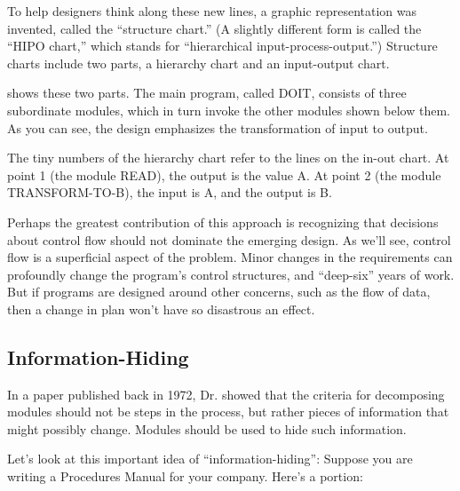 To help designers think along these new lines, a graphic
representation was invented, called the ``structure chart.''%
(A slightly different form is called the ``HIPO chart,'' which stands
for ``hierarchical input-process-output.'') Structure charts include
two parts, a hierarchy chart and an input-output chart.


 shows these two parts. The main program, called DOIT,
consists of three subordinate modules, which in turn invoke the other
modules shown below them. As you can see, the design emphasizes the
transformation of input to output. 

The tiny numbers of the hierarchy chart refer to the lines on the
in-out chart. At point 1 (the module READ), the output is the value A.
At point 2 (the module TRANSFORM-TO-B), the input is A, and the output
is B. 

Perhaps the greatest contribution of this approach is recognizing that
decisions about control flow should not dominate the emerging design.
As we'll see, control flow is a superficial aspect of the problem.
Minor changes in the requirements can profoundly change the program's
control structures, and ``deep-six'' years of work.  But if programs
are designed around other concerns, such as the flow of data, then a
change in plan won't have so disastrous an effect.%
%
%
%


\subsection{Information-Hiding }%
%
%
In a paper \cite{parnas72} published back in 1972,
Dr.\@ {}%
 showed
that the criteria for decomposing modules should not be steps in the
process, but rather pieces of information that might possibly change.
Modules should be used to hide such information.

Let's look at this important idea of ``information-hiding'':
Suppose you are writing a Procedures Manual for your company.
Here's a portion:

